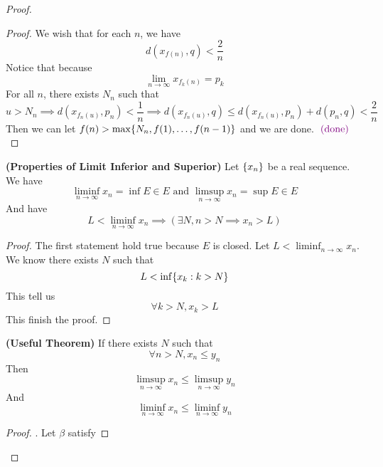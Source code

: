 \documentclass{report}
\begin{document}
\begin{proof}
\begin{proof}
We wish that for each $n$, we have
\begin{equation}
d(x_{f(n)},q)<\frac{2}{n}
\end{equation}
Notice that because 
\begin{equation}
  \lim_{n\to\infty}x_{f_k(n)}=p_k
\end{equation}
For all $n$, there exists  $N_n$ such that
 \begin{equation}
u>N_n\implies d(x_{f_n(u)},p_n)<\frac{1}{n}\implies d(x_{f_n(u)},q)\leq d(x_{f_n(u)},p_n)+d(p_n,q)<\frac{2}{n}
\end{equation}
Then we can let $f(n)>\max \{ N_n, f(1),\dots ,f(n-1) \}$ and we are done. $\textcolor{violet}{\text{ (done) }}$ 
\end{proof}
\begin{theorem}
\label{4.3.11}
\textbf{(Properties of Limit Inferior and Superior)} Let $\{ x_n \}$ be a real sequence. We have 
\begin{equation}
\liminf_{n\to\infty} x_n=\inf E\in E\text{ and }\limsup_{n\to\infty} x_n=\sup E\in E
\end{equation}
And have
\begin{equation}
L<\liminf_{n\to\infty}  x_n\implies (\exists N, n>N\implies x_n>L)
\end{equation}
\end{theorem}
\begin{proof}
The first statement hold true because  $E$ is closed. Let $L<\liminf_{n\to\infty}  x_n$. We know there exists $N$ such that
 \begin{equation}
L<\inf \{ x_k:k>N \}
\end{equation}
This tell us 
\begin{equation}
\forall k>N, x_k>L
\end{equation}
This finish the proof.
\end{proof}
\begin{theorem}
\label{4.3.12}
\textbf{(Useful Theorem)} If there exists $N$ such that
 \begin{equation}
\forall n>N, x_n\leq y_n
\end{equation}
Then
\begin{equation}
\limsup_{n\to\infty} x_n\leq \limsup_{n\to\infty} y_n
\end{equation}
And
\begin{equation}
\liminf_{n\to\infty} x_n\leq \liminf_{n\to\infty} y_n
\end{equation}
\end{theorem}
\begin{proof}
. Let $\beta $ satisfy

\end{proof}
\end{proof}
\end{document}
